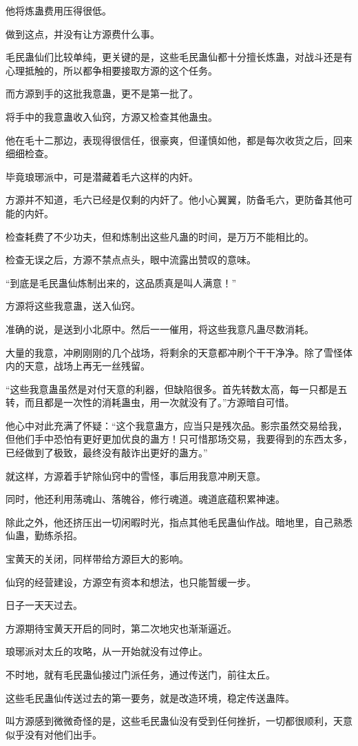 \begin{this_body}
他将炼蛊费用压得很低。

做到这点，并没有让方源费什么事。

毛民蛊仙们比较单纯，更关键的是，这些毛民蛊仙都十分擅长炼蛊，对战斗还是有心理抵触的，所以都争相要接取方源的这个任务。

而方源到手的这批我意蛊，更不是第一批了。

将手中的我意蛊收入仙窍，方源又检查其他蛊虫。

他在毛十二那边，表现得很信任，很豪爽，但谨慎如他，都是每次收货之后，回来细细检查。

毕竟琅琊派中，可是潜藏着毛六这样的内奸。

方源并不知道，毛六已经是仅剩的内奸了。他小心翼翼，防备毛六，更防备其他可能的内奸。

检查耗费了不少功夫，但和炼制出这些凡蛊的时间，是万万不能相比的。

检查无误之后，方源不禁点点头，眼中流露出赞叹的意味。

“到底是毛民蛊仙炼制出来的，这品质真是叫人满意！”

方源将这些我意蛊，送入仙窍。

准确的说，是送到小北原中。然后一一催用，将这些我意凡蛊尽数消耗。

大量的我意，冲刷刚刚的几个战场，将剩余的天意都冲刷个干干净净。除了雪怪体内的天意，战场上再无一丝残留。

“这些我意蛊虽然是对付天意的利器，但缺陷很多。首先转数太高，每一只都是五转，而且都是一次性的消耗蛊虫，用一次就没有了。”方源暗自可惜。

他心中对此充满了怀疑：“这个我意蛊方，应当只是残次品。影宗虽然交易给我，但他们手中恐怕有更好更加优良的蛊方！只可惜那场交易，我要得到的东西太多，已经做到了极致，最终没有敲诈出更好的蛊方。”

就这样，方源着手铲除仙窍中的雪怪，事后用我意冲刷天意。

同时，他还利用荡魂山、落魄谷，修行魂道。魂道底蕴积累神速。

除此之外，他还挤压出一切闲暇时光，指点其他毛民蛊仙作战。暗地里，自己熟悉仙蛊，勤练杀招。

宝黄天的关闭，同样带给方源巨大的影响。

仙窍的经营建设，方源空有资本和想法，也只能暂缓一步。

日子一天天过去。

方源期待宝黄天开启的同时，第二次地灾也渐渐逼近。

琅琊派对太丘的攻略，从一开始就没有过停止。

不时地，就有毛民蛊仙接过门派任务，通过传送门，前往太丘。

这些毛民蛊仙传送过去的第一要务，就是改造环境，稳定传送蛊阵。

叫方源感到微微奇怪的是，这些毛民蛊仙没有受到任何挫折，一切都很顺利，天意似乎没有对他们出手。

\end{this_body}

